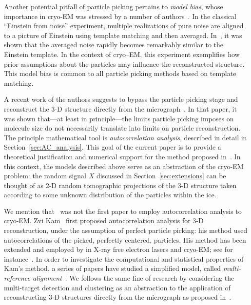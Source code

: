 \documentclass[12pt]{article}
\newcommand{\1}{\mathbf{1}}
\theoremstyle{plain}
\theoremstyle{definition}
\theoremstyle{remark}
\theoremstyle{plain}
\theoremstyle{remark}
\theoremstyle{plain}
\theoremstyle{plain}
\theoremstyle{plain}
\numberwithin{equation}{section}
\begin{document}
Another potential pitfall of particle picking pertains to \emph{model bias}, whose importance in cryo-EM was stressed by a number of authors~\cite{shatsky2009method,vanheel1992correlation,henderson2013avoiding,vanheel2013finding}. In the classical ``Einstein from noise'' experiment, multiple realizations of pure noise are aligned to a picture of Einstein using template matching and then averaged. In~\cite{shatsky2009method}, it was shown that the averaged noise rapidly becomes remarkably similar to the Einstein template. In the context of cryo--EM, this experiment exemplifies how prior assumptions about the particles may influence the reconstructed structure. This model bias is common to all particle picking methods based on template matching. %

A recent work of the authors suggests to bypass the particle picking stage and  reconstruct the 3-D structure directly from the micrograph~\cite{bendory2018toward}.
In that paper, it was shown that---at least in principle---the limits particle picking imposes on molecule size do not necessarily  translate into limits on particle reconstruction.
The principle mathematical tool is  \emph{autocorrelation analysis}, described in detail in Section~\ref{sec:AC_analysis}.
This goal of  the current paper is to provide a theoretical justification and numerical support  for the method proposed in~\cite{bendory2018toward}.  
In this context, the  models described above serve  as  an abstraction of the cryo-EM problem: the random signal $X$ discussed in Section~\ref{sec:extensions} can be thought of as 2-D random tomographic projections of the 3-D structure 
taken according to some unknown distribution of the particles within the ice.


We mention that~\cite{bendory2018toward} was not the first paper to employ autocorrelation analysis to cryo-EM. 
Zvi Kam~\cite{kam1980reconstruction} first proposed autocorrelation analysis for \mbox{3-D} reconstruction, under the assumption of perfect particle picking: his method used autocorrelations of the picked, perfectly centered, particles. His method has been extended and employed by in X-ray free electron lasers and cryo-EM; see for instance~\cite{liu2013three,kurta2017correlations,levin20173d,von2018structure}.  
In order to investigate the computational and statistical properties of Kam's method, a series of papers have studied a simplified model, 
called   \emph{multi-reference alignment}~\cite{bandeira2014multireference,bendory2017bispectrum,bandeira2017optimal,perry2017sample,bandeira2017estimation,abbe2017multireference}.
We follows the same line of research by considering the multi-target detection and clustering  as an abstraction to the application of reconstructing 3-D structures directly from the micrograph as proposed in~\cite{bendory2018toward}.
\end{document}
